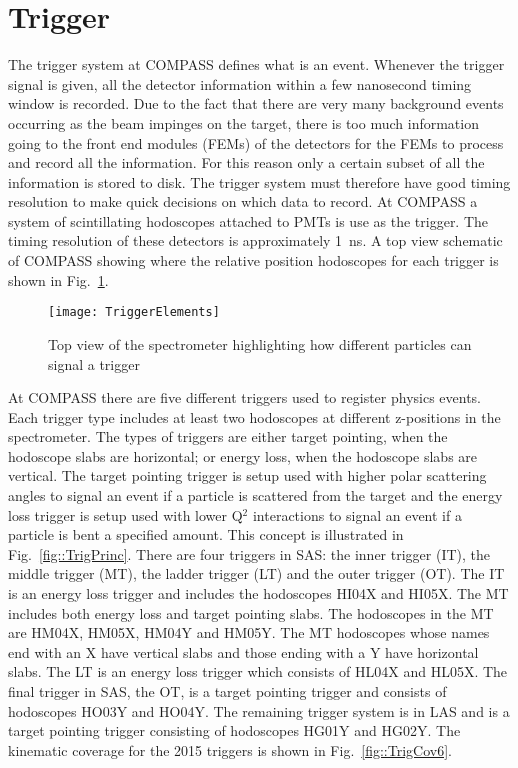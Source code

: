 \section{Trigger}
The trigger system at COMPASS defines what is an event.  Whenever the trigger
signal is given, all the detector information within a few nanosecond timing
window is recorded.  Due to the fact that there are very many
background events occurring as the beam impinges on the target, there is too
much information going to the front end modules (FEMs) of the detectors for the
FEMs to process and record all the information.  For this reason only a certain
subset of all the information is stored to disk.  The trigger system must
therefore have good timing resolution to make quick decisions on which data to
record.  At COMPASS a system of scintillating hodoscopes attached to PMTs is use
as the trigger.  The timing resolution of these detectors is approximately 1~ns.
A top view schematic of COMPASS showing where the relative position hodoscopes
for each trigger is shown in Fig.~\ref{fig::TriggerElements}.  \par

\begin{figure}[h!t]
  \centering
  \texttt{[image: TriggerElements]}
  \caption{Top view of the spectrometer highlighting how different particles can
    signal a trigger}
  \label{fig::TriggerElements}
\end{figure}

At COMPASS there are five different triggers used to register physics events.
Each trigger type includes at least two hodoscopes at different z-positions in
the spectrometer.  The types of triggers are either target pointing, when the
hodoscope slabs are horizontal; or energy loss, when the hodoscope slabs are
vertical.  The target pointing trigger is setup used with higher polar
scattering angles to signal an event if a particle is scattered from the target
and the energy loss trigger is setup used with lower Q$^2$ interactions to
signal an event if a particle is bent a specified amount.  This concept is
illustrated in Fig.~\ref{fig::TrigPrinc}.  There are four triggers in SAS: the
inner trigger (IT), the middle trigger (MT), the ladder trigger (LT) and the
outer trigger (OT).  The IT is an energy loss trigger and includes the
hodoscopes HI04X and HI05X.  The MT includes both energy loss and target
pointing slabs.  The hodoscopes in the MT are HM04X, HM05X, HM04Y and HM05Y.
The MT hodoscopes whose names end with an X have vertical slabs and those ending
with a Y have horizontal slabs.  The LT is an energy loss trigger which consists
of HL04X and HL05X.  The final trigger in SAS, the OT, is a target pointing
trigger and consists of hodoscopes HO03Y and HO04Y.  The remaining trigger
system is in LAS and is a target pointing trigger consisting of hodoscopes HG01Y
and HG02Y.  The kinematic coverage for the 2015 triggers is shown in
Fig.~\ref{fig::TrigCov6}. \par

